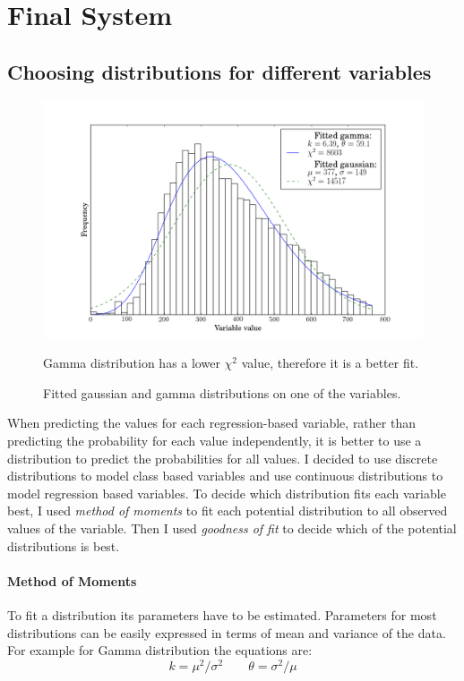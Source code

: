 \documentclass[12pt,a4paper]{book}
\newcommand\note[1]{\vspace*{-0.5\baselineskip}\caption*{#1}}
\begin{document}
\section{Final System}
\subsection{Choosing distributions for different variables}
\label{distribution-selection}
\begin{figure}[ht]
\centering
\includegraphics[scale=0.5]{fitted-distributions}
\caption{Fitted gaussian and gamma distributions on one of the variables.}
\note{Gamma distribution has a lower $\chi^2$ value, therefore it is a better fit.}
\label{fig:fitted-distributions}
\end{figure}
When predicting the values for each regression-based variable, rather than predicting the probability for each value independently, it is better to use a distribution to predict the probabilities for all values.
I decided to use discrete distributions to model class based variables and use continuous distributions to model regression based variables.
To decide which distribution fits each variable best, I used \emph{method of moments} to fit each potential distribution to all observed values of the variable.
Then I used \emph{goodness of fit} to decide which of the potential distributions is best.
\paragraph{Method of Moments}
To fit a distribution its parameters have to be estimated.
Parameters for most distributions can be easily expressed in terms of mean and variance of the data.
For example for Gamma distribution the equations are:
\begin{equation*}
k= \mu^2/\sigma^2
\qquad
\theta = \sigma^2/\mu
\end{equation*}
\end{document}

